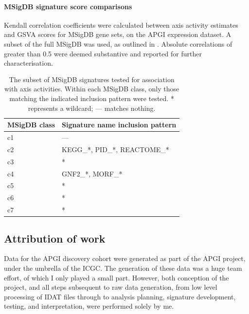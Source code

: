 \documentclass[dissertation.tex]{subfiles}
\begin{document}
\paragraph{\acrshort{MSigDB} signature score comparisons}
Kendall correlation coefficients were calculated between axis activity estimates and \gls{GSVA} scores for \gls{MSigDB} gene sets, on the \gls{APGI} expression dataset.  A subset of the full \gls{MSigDB} was used, as outlined in .  Absolute correlations of greater than 0.5 were deemed substantive and reported for further characterisation.

\begin{table}[h]
\centering
\caption[Subset of \acrshort{MSigDB} signatures tested for association with axis activities]{The subset of \acrshort{MSigDB} signatures tested for association with axis activities.  Within each \gls{MSigDB} class, only those matching the indicated inclusion pattern were tested.  * represents a wildcard; --- matches nothing.}\label{sigs-msigdb-subset}
\begin{tabular}{@{}ll@{}}
\toprule
MSigDB class & Signature name inclusion pattern   \\ \midrule
c1           & ---                                \\
c2           & KEGG\_*, PID\_*, REACTOME\_*       \\
c3           & *                                  \\
c4           & GNF2\_*, MORF\_*                   \\
c5           & *                                  \\
c6           & *                                  \\
c7           & *                                  \\ \bottomrule
\end{tabular}
\end{table}

\subsection{Attribution of work}
Data for the \gls{APGI} discovery cohort were generated as part of the \gls{APGI} project, under the umbrella of the \gls{ICGC}.  The generation of these data was a huge team effort, of which I only played a small part.  However, both conception of the project, and all steps subsequent to raw data generation, from low level processing of \gls{IDAT} files through to analysis planning, signature development, testing, and interpretation, were performed solely by me.
\end{document}
